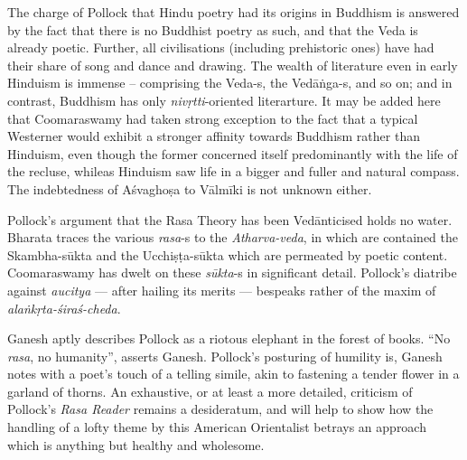 The charge of Pollock that Hindu poetry had its origins in Buddhism is answered by the fact that there is no Buddhist poetry as such, and that the Veda is already poetic. Further, all civilisations (including prehistoric ones) have had their share of song and dance and drawing. The wealth of literature even in early Hinduism is immense -- comprising the Veda-s, the Vedāṅga-s, and so on; and in contrast, Buddhism has only \textsl{nivṛtti}-oriented literarture. It may be added here that Coomaraswamy had taken strong exception to the fact that a typical Westerner would exhibit a stronger affinity towards Buddhism rather than Hinduism, even though the former concerned itself predominantly with the life of the recluse, whileas Hinduism saw life in a bigger and fuller and natural compass. The indebtedness of Aśvaghoṣa to Vālmīki is not unknown either.

Pollock’s argument that the Rasa Theory has been Vedānticised holds no water. Bharata traces the various \textsl{rasa}-s to the \textsl{Atharva-veda}, in which are contained the Skambha-sūkta and the Ucchiṣṭa-sūkta which are permeated by poetic content. Coomaraswamy has dwelt on these \textsl{sūkta}-s in significant detail. Pollock’s diatribe against \textsl{aucitya} --- after hailing its merits --- bespeaks rather of the maxim of \textsl{alaṅkṛta-śiraś-cheda}.

Ganesh aptly describes Pollock as a riotous elephant in the forest of books. “No \textsl{rasa}, no humanity”, asserts Ganesh. Pollock's posturing of humility is, Ganesh notes with a poet's touch of a telling simile, akin to fastening a tender flower in a garland of thorns. An exhaustive, or at least a more detailed, criticism of Pollock’s \textsl{Rasa Reader} remains a desideratum, and will help to show how the handling of a lofty theme by this American Orientalist betrays an approach which is anything but healthy and wholesome.

